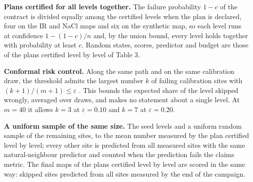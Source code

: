 \documentclass{iopjournal}
\begin{document}
\textbf{Plans certified for all levels together.} The failure probability \(1 - c\) of the contract is divided equally among the certified levels when the plan is declared, four on the IR and NaCl maps and six on the synthetic map, so each level runs at confidence \(1 - (1 - c)/n\) and, by the union bound, every level holds together with probability at least \(c\). Random states, scores, predictor and budget are those of the plans certified level by level of Table 3.

\textbf{Conformal risk control.} Along the same path and on the same calibration draw, the threshold admits the largest number \(k\) of failing calibration sites with \((k + 1)/(m + 1) \le \varepsilon\) \cite{Angelopoulos2024}. This bounds the expected share of the level skipped wrongly, averaged over draws, and makes no statement about a single level. At \(m = 40\) it allows \(k = 3\) at \(\varepsilon = 0.10\) and \(k = 7\) at \(\varepsilon = 0.20\).

\textbf{A uniform sample of the same size.} The seed levels and a uniform random sample of the remaining sites, to the mean number measured by the plan certified level by level; every other site is predicted from all measured sites with the same natural-neighbour predictor and counted when the prediction fails the claim\textquotesingle s metric. The final maps of the plans certified level by level are scored in the same way: skipped sites predicted from all sites measured by the end of the campaign.
\end{document}
